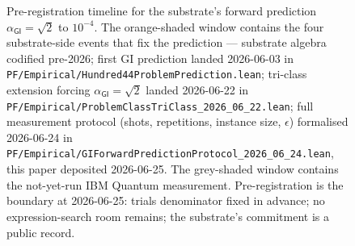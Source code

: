 \documentclass[11pt,a4paper]{amsart}
\theoremstyle{plain}
\theoremstyle{definition}
\begin{document}
\begin{figure}[h]
\caption{Pre-registration timeline for the substrate's forward prediction $\alpha_{\textsf{GI}} = \sqrt{2}$ to $10^{-4}$. The orange-shaded window contains the four substrate-side events that fix the prediction --- substrate algebra codified pre-2026; first GI prediction landed 2026-06-03 in \texttt{PF/Empirical/Hundred44ProblemPrediction.lean}; tri-class extension forcing $\alpha_{\textsf{GI}} = \sqrt{2}$ landed 2026-06-22 in \texttt{PF/Empirical/ProblemClassTriClass\_2026\_06\_22.lean}; full measurement protocol (shots, repetitions, instance size, $\epsilon$) formalised 2026-06-24 in \texttt{PF/Empirical/GIForwardPredictionProtocol\_2026\_06\_24.lean}, this paper deposited 2026-06-25. The grey-shaded window contains the not-yet-run IBM Quantum measurement. Pre-registration is the boundary at 2026-06-25: trials denominator fixed in advance; no expression-search room remains; the substrate's commitment is a public record.}
\label{fig:timeline}
\end{figure}
\end{document}
